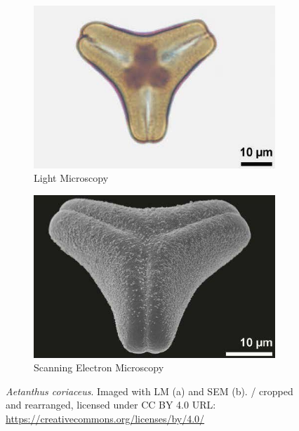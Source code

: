 \begin{figure}[htb]
  \centering
  \begin{subfigure}[t]{0.4\textwidth}
    \centering
    \includegraphics[width=\textwidth]{figs/background/pollen_lm.jpg}
    \caption{Light Microscopy}
  \end{subfigure}%
  \hspace*{0.04\textwidth}
  \begin{subfigure}[t]{0.4\textwidth}
    \centering
    \includegraphics[width=\textwidth]{figs/background/pollen_sem.jpg}
    \caption{Scanning Electron Microscopy}
  \end{subfigure}
  \caption[Pollen grain imaging examples using LM and SEM]{\textit{Aetanthus coriaceus}.
  Imaged with LM (a) and SEM (b). \textcite[98]{halbritter_methods_2018} / cropped and rearranged, licensed under CC BY 4.0 URL\@: \url{https://creativecommons.org/licenses/by/4.0/}}\label{fig:lm_and_sem}
\end{figure}

